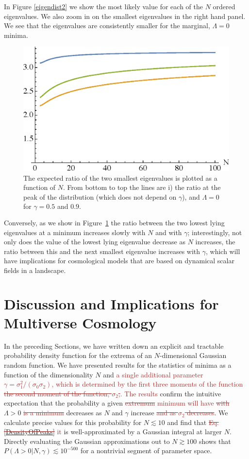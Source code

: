 \documentclass[12pt]{article}
\newcommand{\sh}[1]{\textcolor{brown}{#1}}
\begin{document}
In Figure \ref{eigendist2} we show the most likely value for each of the $N$ ordered eigenvalues. We also zoom in on the smallest eigenvalues in the right hand panel. We see that the eigenvalues are consistently smaller for the marginal, $\Lambda=0$ minima.

\begin{figure} 
  \centering
  \includegraphics[width=.6\linewidth]{ratio.eps}  
  \caption{The expected ratio of the two smallest eigenvalues is plotted as a function of $N$.   From bottom to top the lines are i) the ratio at the peak  of the distribution (which does not depend on $\gamma$), and $\Lambda=0$ for $\gamma =0.5$ and $0.9$.}
  \label{ratio}
\end{figure}

Conversely, as we show in Figure~\ref{ratio} the ratio between the two lowest lying eigenvalues at a minimum increases slowly with $N$ and with $\gamma$; interestingly, not only does the value of the lowest lying eigenvalue decrease as  $N$ increases, the ratio between this and the next smallest eigenvalue increases with $\gamma$, which will have implications for cosmological models that are based on dynamical scalar fields in a landscape. 





 
\section{Discussion and Implications for Multiverse Cosmology}

In the preceding Sections, we have  written down an explicit and tractable probability density function for the extrema of an $N$-dimensional  Gaussian random function. We have presented results for the statistics of minima as a function of the dimensionality $N$ and \sh{a single additional parameter $\gamma=\sigma_1^2/(\sigma_0\sigma_2)$, which is determined by the first three moments of the function \sout{the second moment of the function, $\sigma_2$,}. The results} confirm the intuitive expectation that the probability a given \sh{\sout{extremum} minimum will have \sout{with}} $\Lambda > 0$ \sh{\sout{is a minimum}} decreases as $N$ and $\gamma$ increase \sh{\sout{and as $\sigma_2$ decreases}}. We calculate precise values for this probability for $N \lesssim10$ and find that \sh{\sout{Eq. \ref{DensityOfPeaks}} it } is well-approximated by a Gaussian integral at larger $N$. Directly evaluating the Gaussian approximations out to $N \gtrsim 100$ shows that $P(\Lambda > 0| N, \gamma) \lesssim 10^{-500}$ for a nontrivial segment of parameter space.
\end{document}
